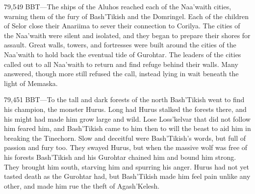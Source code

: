 \documentclass[smalldemyvopaper,11pt,twoside,onecolumn,openright,extrafontsizes]{memoir}
\begin{document}
{{79,549 BBT—The ships of the Aluhos reached each of the Naa’waith cities, warning them of the fury of Bash’Tikish and the Domringel. Each of the children of Selor close their Anariima to sever their connection to Corilya. The cities of the Naa’waith were silent and isolated, and they began to prepare their shores for assault. Great walls, towers, and fortresses were built around the cities of the Naa’waith to hold back the eventual tide of Gurohtar. The leaders of the cities called out to all Naa’waith to return and find refuge behind their walls. Many answered, though more still refused the call, instead lying in wait beneath the light of Memaska.

79,451 BBT—To the tall and dark forests of the north Bash’Tikish went to find his champion, the monster Hurus. Long had Hurus stalked the forests there, and his might had made him grow large and wild. Lose Loss’kelvar that did not follow him feared him, and Bash’Tikish came to him then to will the beast to aid him in breaking the Tinechorn. Slow and deceitful were Bash’Tikish’s words, but full of passion and fury too. They swayed Hurus, but when the massive wolf was free of his forests Bash’Tikish and his Gurohtar chained him and bound him strong. They brought him south, starving him and spurring his anger. Hurus had not yet tasted death as the Gurohtar had, but Bash’Tikish made him feel pain unlike any other, and made him rue the theft of Agash’Kelesh.

}}
\end{document}
